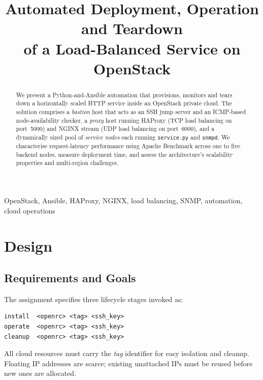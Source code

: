 \documentclass[conference]{IEEEtran}
\begin{document}
\title{Automated Deployment, Operation and Teardown\\
of a Load-Balanced Service on OpenStack}

\author{%
  }

\maketitle

\begin{abstract}
We present a Python-and-Ansible automation that provisions, monitors
and tears down a horizontally scaled HTTP service inside an OpenStack
private cloud.  The solution comprises a \emph{bastion} host that acts
as an SSH jump server and an ICMP-based node-availability checker, a
\emph{proxy} host running HAProxy (TCP load balancing on port~5000)
and NGINX stream (UDP load balancing on port~6000), and a dynamically
sized pool of \emph{service nodes} each running \texttt{service.py}
and \texttt{snmpd}.  We characterise request-latency performance using
Apache Benchmark across one to five backend nodes, measure deployment
time, and assess the architecture's scalability properties and
multi-region challenges.
\end{abstract}

\begin{IEEEkeywords}
OpenStack, Ansible, HAProxy, NGINX, load balancing, SNMP, automation,
cloud operations
\end{IEEEkeywords}

\section{Design}
\label{sec:design}

\subsection{Requirements and Goals}

The assignment specifies three lifecycle stages invoked as:
\begin{lstlisting}
install  <openrc> <tag> <ssh_key>
operate  <openrc> <tag> <ssh_key>
cleanup  <openrc> <tag> <ssh_key>
\end{lstlisting}
All cloud resources must carry the \emph{tag} identifier for easy
isolation and cleanup. Floating IP addresses are scarce; existing
unattached IPs must be reused before new ones are allocated.
\end{document}
